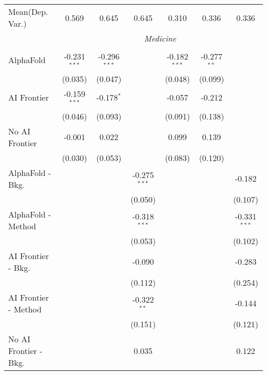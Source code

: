 \begin{tabular}{lcccccc}
Mean(Dep. Var.) & 0.569 & 0.645 & 0.645 & 0.310 & 0.336 & 0.336 \\
 & \multicolumn{6}{c}{\textit{Medicine}} \\ \\
   AlphaFold               & -0.231$^{***}$ & -0.296$^{***}$ &                & -0.182$^{***}$ & -0.277$^{**}$ &   \\   
                           & (0.035)        & (0.047)        &                & (0.048)        & (0.099)       &   \\   
   AI Frontier             & -0.159$^{***}$ & -0.178$^{*}$   &                & -0.057         & -0.212        &   \\   
                           & (0.046)        & (0.093)        &                & (0.091)        & (0.138)       &   \\   
   No AI Frontier          & -0.001         & 0.022          &                & 0.099          & 0.139         &   \\   
                           & (0.030)        & (0.053)        &                & (0.083)        & (0.120)       &   \\   
   AlphaFold - Bkg.        &                &                & -0.275$^{***}$ &                &               & -0.182\\   
                           &                &                & (0.050)        &                &               & (0.107)\\   
   AlphaFold - Method      &                &                & -0.318$^{***}$ &                &               & -0.331$^{***}$\\   
                           &                &                & (0.053)        &                &               & (0.102)\\   
   AI Frontier - Bkg.      &                &                & -0.090         &                &               & -0.283\\   
                           &                &                & (0.112)        &                &               & (0.254)\\   
   AI Frontier - Method    &                &                & -0.322$^{**}$  &                &               & -0.144\\   
                           &                &                & (0.151)        &                &               & (0.121)\\   
   No AI Frontier - Bkg.   &                &                & 0.035          &                &               & 0.122\\   

\end{tabular}
